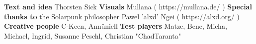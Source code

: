 \newpage
\begin{center}
\textbf{Text and idea}
\newline
Thorsten Sick
\newline
\textbf{Visuals}
\newline
Mullana ( https://mullana.de/ )
\newline
\textbf{Special thanks to}
\newline
the Solarpunk philosopher Pawel 'alxd' Ngei ( https://alxd.org/ )
\newline
\textbf{Creative people}
\newline
C-Keen, Annûniell
\newline
\textbf{Test players}
\newline
Matze, Bene, Micha, Michael, Ingrid, Susanne Peschl, Christian "ChadTaranta"
\newline
\end{center}
\newpage